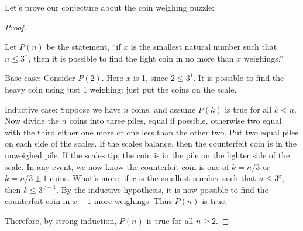 \documentclass[10pt,]{book}
\theoremstyle{plain}
\theoremstyle{definition}
\theoremstyle{definition}
\theoremstyle{definition}
\numberwithin{equation}{chapter}
\newcommand{\lt}{ < }
\begin{document}
Let's prove our conjecture about the coin weighing puzzle:
%
\begin{proof}\hypertarget{proof-17}{}

Let \(P(n)\) be the statement, ``if \(x\) is the smallest natural number such that \(n \le 3^x\), then it is possible to find the light coin in no more than \(x\) weighings.''
%
\par

Base case: Consider \(P(2)\). Here \(x\) is 1, since \(2 \le 3^1\). It is possible to find the heavy coin using just 1 weighing: just put the coins on the scale.
%
\par

Inductive case: Suppose we have \(n\) coins, and assume \(P(k)\) is true for all \(k \lt  n\). Now divide the \(n\) coins into three piles, equal if possible, otherwise two equal with the third either one more or one less than the other two. Put two equal piles on each side of the scales. If the scales balance, then the counterfeit coin is in the unweighed pile. If the scales tip, the coin is in the pile on the lighter side of the scale. In any event, we now know the counterfeit coin is one of \(k = n/3\) or \(k = n/3\pm 1\) coins. What's more, if \(x\) is the smallest number such that \(n \le 3^x\), then \(k \le 3^{x-1}\). By the inductive hypothesis, it is now possible to find the counterfeit coin in \(x-1\) more weighings. Thus \(P(n)\) is true.
%
\par

Therefore, by strong induction, \(P(n)\) is true for all \(n \ge 2\).
%
\end{proof}
\par
\end{document}
